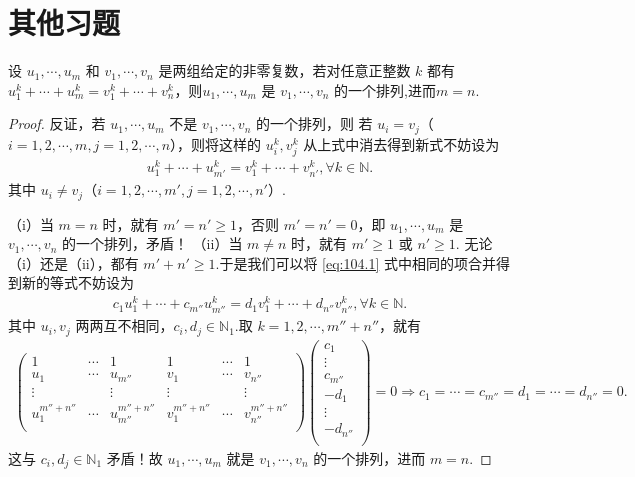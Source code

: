 \documentclass[../../main.tex]{subfiles}%
\begin{document}
\section{其他习题}

\begin{lemma}\label{lemma:引理1564561}
设 $u_1,\cdots,u_m$ 和 $v_1,\cdots,v_n$ 是两组给定的非零复数，若对任意正整数 $k$ 都有 $u_1^k+\cdots+u_m^k=v_1^k+\cdots+v_n^k$，则$u_1,\cdots,u_m$ 是 $v_1,\cdots,v_n$ 的一个排列,进而$m=n$.
\end{lemma}
\begin{proof}

反证，若 $u_1,\cdots ,u_m$ 不是 $v_1,\cdots ,v_n$ 的一个排列，则
若 $u_i=v_j$（$i=1,2,\cdots ,m,j=1,2,\cdots ,n$），则将这样的 $u_{i}^{k},v_{j}^{k}$ 从上式中消去得到新式不妨设为
\begin{align}
u_{1}^{k}+\cdots +u_{m'}^{k}=v_{1}^{k}+\cdots +v_{n'}^{k},\forall k\in \mathbb{N} .\label{eq:104.1}
\end{align}
其中 $u_i\ne v_j$（$i=1,2,\cdots ,m',j=1,2,\cdots ,n'$）.

（i）当 $m=n$ 时，就有 $m' =n' \geqslant 1$，否则 $m' =n' =0$，即 $u_1,\cdots ,u_m$ 是 $v_1,\cdots ,v_n$ 的一个排列，矛盾！
（ii）当 $m\ne n$ 时，就有 $m' \geqslant 1$ 或 $n' \geqslant 1$.
无论（i）还是（ii），都有 $m' +n' \geqslant 1$.于是我们可以将 \eqref{eq:104.1} 式中相同的项合并得到新的等式不妨设为
\begin{align*}
c_1u_{1}^{k}+\cdots +c_{m''}u_{m''}^{k}=d_1v_{1}^{k}+\cdots +d_{n''}v_{n''}^{k},\forall k\in \mathbb{N} .
\end{align*}
其中 $u_i,v_j$ 两两互不相同，$c_i,d_j\in \mathbb{N} _1$.取 $k=1,2,\cdots ,m'' +n''$，就有
\begin{align*}
\begin{pmatrix}
1&		\cdots&		1&		1&		\cdots&		1\\
u_1&		\cdots&		u_{m''}&		v_1&		\cdots&		v_{n''}\\
\vdots&		&		\vdots&		\vdots&		&		\vdots\\
u_{1}^{m'' +n''}&		\cdots&		u_{m''}^{m'' +n''}&		v_{1}^{m'' +n''}&		\cdots&		v_{n''}^{m'' +n''}\\
\end{pmatrix} \begin{pmatrix}
c_1\\
\vdots\\
c_{m''}\\
-d_1\\
\vdots\\
-d_{n''}\\
\end{pmatrix} =0\Rightarrow c_1=\cdots =c_{m''}=d_1=\cdots =d_{n''}=0.
\end{align*}
这与 $c_i,d_j\in \mathbb{N} _1$ 矛盾！故 $u_1,\cdots ,u_m$ 就是 $v_1,\cdots ,v_n$ 的一个排列，进而 $m=n$.

\end{proof}
\end{document}
